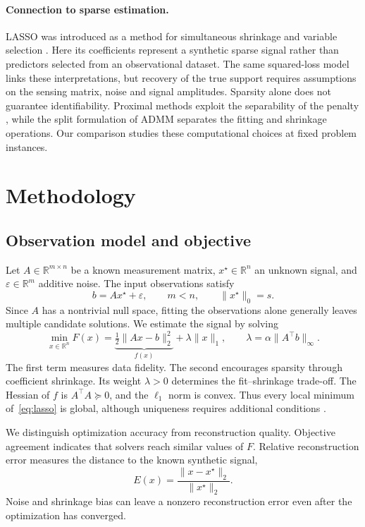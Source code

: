 \documentclass{article}
\begin{document}
\paragraph{Connection to sparse estimation.}
LASSO was introduced as a method for simultaneous shrinkage and variable selection \citep{tibshirani1996}. Here its coefficients represent a synthetic sparse signal rather than predictors selected from an observational dataset. The same squared-loss model links these interpretations, but recovery of the true support requires assumptions on the sensing matrix, noise and signal amplitudes. Sparsity alone does not guarantee identifiability. Proximal methods exploit the separability of the penalty \citep{parikh2014}, while the split formulation of ADMM separates the fitting and shrinkage operations. Our comparison studies these computational choices at fixed problem instances.

\section{Methodology}
\subsection{Observation model and objective}
Let $A\in\mathbb{R}^{m\times n}$ be a known measurement matrix, $x^\star\in\mathbb{R}^n$ an unknown signal, and $\varepsilon\in\mathbb{R}^m$ additive noise. The input observations satisfy
\begin{equation}
 b=Ax^\star+\varepsilon,\qquad m<n,\qquad \|x^\star\|_0=s.
\end{equation}
Since $A$ has a nontrivial null space, fitting the observations alone generally leaves multiple candidate solutions. We estimate the signal by solving
\begin{equation}\label{eq:lasso}
 \min_{x\in\mathbb{R}^n}F(x)=\underbrace{\tfrac12\|Ax-b\|_2^2}_{f(x)}+\lambda\|x\|_1,
 \qquad \lambda=\alpha\|A^\top b\|_\infty.
\end{equation}
The first term measures data fidelity. The second encourages sparsity through coefficient shrinkage. Its weight $\lambda>0$ determines the fit--shrinkage trade-off. The Hessian of $f$ is $A^\top A\succeq0$, and the $\ell_1$ norm is convex. Thus every local minimum of~\eqref{eq:lasso} is global, although uniqueness requires additional conditions \citep{boyd2004}.

We distinguish optimization accuracy from reconstruction quality. Objective agreement indicates that solvers reach similar values of $F$. Relative reconstruction error measures the distance to the known synthetic signal,
\begin{equation}
 E(x)=\frac{\|x-x^\star\|_2}{\|x^\star\|_2}.
\end{equation}
Noise and shrinkage bias can leave a nonzero reconstruction error even after the optimization has converged.
\end{document}
